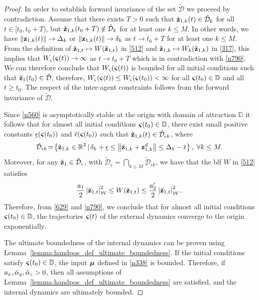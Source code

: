\begin{proof}
	In order to establish forward invariance of the set $\mathcal{\tilde D}$ we proceed by contradiction.
	Assume that there exists $T>0$ such that $\tilde{\mathbf{z}}_{1, k}(t) \in \mathcal{\tilde D}_k$ for all $t \in [t_0,t_0+T)$, but $\tilde{\mathbf{z}}_{1, k}(t_0+T) \notin \mathcal{\tilde D}_k$ for at least one $k\leq M$.
	In other words, we have $\left\|\mathbf{z}_{1, k}(t)\right\|\rightarrow \Delta_k$ or $\left\|\mathbf{z}_{1, k}(t)\right\|\rightarrow \delta_k$ as $t\rightarrow t_0+T$ for at least one ${k\leq M}$.
	From the definition of $\tilde{\mathbf{z}}_{1, t}\mapsto W(\tilde{\mathbf{z}}_{1, t})$ in \eqref{512} and $\tilde{\mathbf{z}}_{1, k}\mapsto W_k(\tilde{\mathbf{z}}_{1, k})$ in \eqref{317}, this implies that $W_\varsigma(\bm{\varsigma}(t)) \rightarrow\infty$ as $t\rightarrow t_0+T$ which is in contradiction with \eqref{n790}.
	We can therefore conclude that $W_\varsigma(\bm{\varsigma}(t))$ is bounded for all initial conditions such that $\tilde{\mathbf{z}}_{1}(t_0)\in \mathcal{\tilde D}$, therefore, $W_\varsigma(\bm{\varsigma}(t))\leq W_\varsigma(\bm{\varsigma}(t_0)) <\infty$ for all $\bm{\varsigma}(t_0)\in\mathbb{D}$ and all $t\geq t_0$.
	The respect of the inter-agent constraints follows from the forward invariance of $\mathcal{\tilde D}$.
	
	Since \eqref{n560} is asymptotically stable at the origin with domain of attraction $\mathbb{D}$ it follows that for almost all initial conditions $\bm{\varsigma}(t_0)\in\mathbb{D}$, there exist small positive constants $\underline\epsilon(\bm{\varsigma}(t_0))$ and $\overline\epsilon(\bm{\varsigma}(t_0))$ such that $\tilde{\mathbf{z}}_{1, k}(t)\in\mathcal{\tilde D}_{\epsilon k}$, where
	$$\mathcal{\tilde D}_{\epsilon k}\!=\!\left\{\tilde{\mathbf{z}}_{1, k}\in\mathbb{R}^{3}\,|\,\delta_k+\underline\epsilon\leq\left\|\tilde{\mathbf{z}}_{1, k}+\mathbf{z}_{1, k}^d\right\|\leq\Delta_k-\overline\epsilon\right\},\; \forall k\leq M.$$
	Moreover, for any $\tilde{\mathbf{z}}_{1}\in\mathcal{\tilde D}_{\epsilon}$, with $\mathcal{\tilde D}_{\epsilon}=\bigcap_{k\leq M} \mathcal{\tilde{D}}_{\epsilon k}$, we have that the \gls{blf} $W$ in \eqref{512} satisfies		
	\begin{equation}\label{629}
	\frac{a_1}{2}\left|\tilde{\mathbf{z}}_{1. t}\right|_{\mathcal{W}}^2\leq W(\tilde{\mathbf{z}}_{1, t})\leq \frac{a_2'}{2}\left|\tilde{\mathbf{z}}_{1, t}\right|_{\mathcal{W}}^2.
	\end{equation}	
	Therefore, from \eqref{629} and \eqref{n790}, we conclude that for almost all initial conditions $\bm{\varsigma}(t_0)\in\mathbb{D}$, the trajectories $\bm{\varsigma}(t)$ of the external dynamics converge to the origin exponentially.

	The ultimate boundedness of the internal dynamics can be proven using Lemma~\ref{lemma:handpos_def_ultimate_boundedness}.
	If the initial conditions satisfy $\bm{\varsigma}(t_0)\in\mathbb{D}$, the input $\bm{\mu}$ defined in \eqref{n338} is bounded.
	Therefore, if $a_x, \Bar{\alpha}_y, \Bar{\alpha}_z > 0$, then all assumptions of Lemma~\ref{lemma:handpos_def_ultimate_boundedness} are satisfied, and the internal dynamics are ultimately bounded.
\end{proof}

